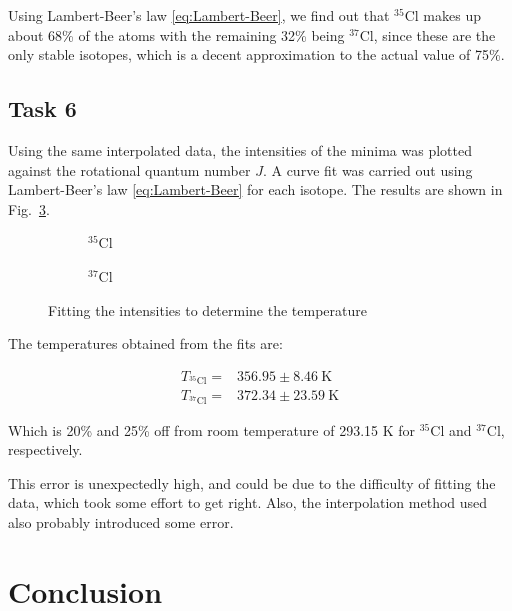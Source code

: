 \documentclass{article}
\begin{document}
Using Lambert-Beer's law \ref{eq:Lambert-Beer}, we find out that $^{35} \mathrm{Cl}$ makes up about 68\% of the atoms with the remaining 32\% being $^{37} \mathrm{Cl}$, since these are the only stable isotopes, which is a decent approximation to the actual value of 75\%.

\pagebreak{}

\subsection{Task 6}

Using the same interpolated data, the intensities of the minima was plotted against the rotational quantum number $J$. A curve fit was carried out using Lambert-Beer's law \ref{eq:Lambert-Beer} for each isotope. The results are shown in Fig.~\ref{fig:ClFits}.

\begin{figure}[H]
	\centering
	\begin{subfigure}{0.45\textwidth}
		\centering
		\scalebox{0.50}{}
		\caption{$^{35}$Cl}
		\label{fig:Cl35_intensities}
	\end{subfigure}	
	\hspace{0.5cm}
	\begin{subfigure}{0.45\textwidth}
		\centering
		\scalebox{0.50}{}
		\caption{$^{37}$Cl}
		\label{fig:Cl37_intensities}
	\end{subfigure}
	\caption{Fitting the intensities to determine the temperature}
	\label{fig:ClFits}
\end{figure}

The temperatures obtained from the fits are: 

\begin{align*}
	T_{^{35} \mathrm{Cl}} =& 356.95 \pm 8.46 \ \text{K}
	\\
	T_{^{37} \mathrm{Cl}} =& 372.34 \pm 23.59 \ \text{K}
\end{align*}

Which is 20\% and 25\% off from room temperature of 293.15 K for $^{35} \mathrm{Cl}$ and $^{37} \mathrm{Cl}$, respectively.

This error is unexpectedly high, and could be due to the difficulty of fitting the data, which took some effort to get right. Also, the interpolation method used also probably introduced some error.

\pagebreak{}

\section{Conclusion}
\end{document}
